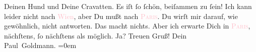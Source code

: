                     Deinen Hund und Deine Cravatten. Es iſt ſo ſchön, beiſammen zu ſein!\pend
           \pstart
           Ich kann leider nicht nach \textcolor{pink}{Wien}{}\ledrightnote{\textcolor{pink}{Wien}}, aber Du mußt
                    nach \textcolor{pink}{\textsc{Paris}}{}\ledrightnote{\textcolor{pink}{Paris}}. Du wirſt mir darauf, wie gewöhnlich, nicht antworten. Das macht nichts.
                    Aber ich  erwarte Dich in \textcolor{pink}{\textsc{Paris}}{}\ledrightnote{\textcolor{pink}{Paris}}, nächſtens, ſo nächſtens als möglich. Ja? Treuen Gruß!\pend
           \pstart
           Dein{\\[\baselineskip]}\spacefill\mbox{Paul Goldmann.}\pend
           \leftskip=0em{}\endnumbering{}  
      